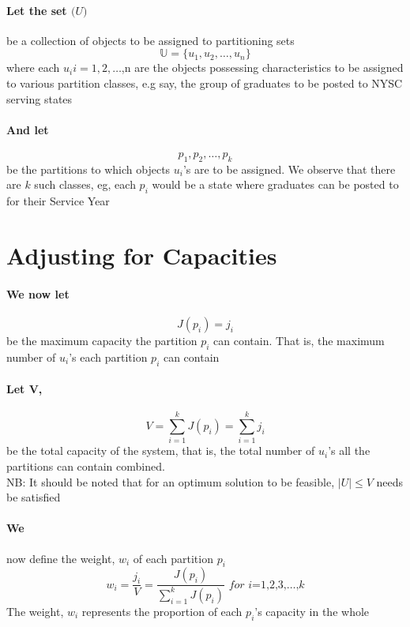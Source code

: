 \documentclass[a4paper,openany]{book}
\begin{document}
			\paragraph{Let the set $\mathbb(U)$} be a collection of objects to be assigned to partitioning sets
				\begin{equation}
					\mathbb{U} = \{u_1, u_2,\dots,u_n\}				
				\end{equation}
				where each $u_i i=1,2,\dots$,n are the objects possessing characteristics to be assigned to various partition classes, e.g say, the group of graduates to be posted to NYSC serving states
			\paragraph{And let}
			\begin{equation}
				p_1,p_2,\dots,p_k
			\end{equation}
				be the partitions to which objects $u_i$'s are to be assigned. We observe that there are $k$ such classes, eg, each $p_i$ would be a state where graduates can be posted to for their Service Year
		\section{Adjusting for Capacities}
			\paragraph{We now let}
				\begin{equation}
					J(p_i) = j_i
				\end{equation}
				be the maximum capacity the partition $p_i$ can contain. That is, the maximum number of $u_i$'s each partition $p_i$ can contain
			\paragraph{Let V,}
				\begin{equation}
					V = \sum_{ i = 1 }^{k}{J(p_i)} = \sum_{i=1}^{k}{j_i}
				\end{equation}
				be the total capacity of the system, that is, the total number of $u_i$'s all the partitions can contain combined.\\
				NB: It should be noted that for an optimum solution to be feasible, $\mid U \mid \leq V$ needs be satisfied
			\paragraph{We}
				now define the weight, $w_i$ of each partition $p_i$
				\begin{equation}
					w_i = \frac{j_i}{V} = \frac{J(p_i)}{\sum_{i=1}^{k}{J(p_i)}}  \textit{ for i=1,2,3,}\dots\text{,}k
				\end{equation}
				The weight, $w_i$ represents the proportion of each $p_i$'s capacity in the whole
\end{document}
